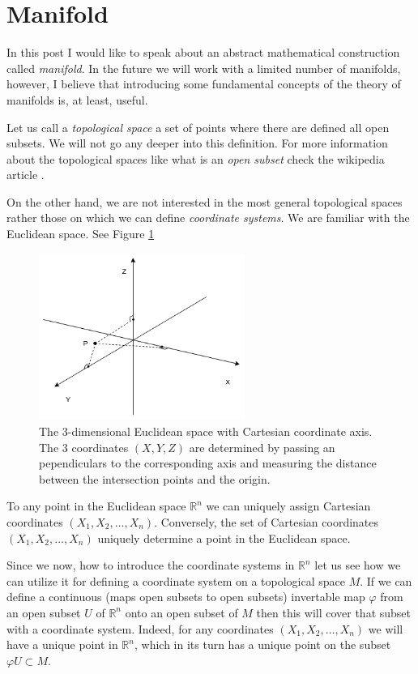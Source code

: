 \documentclass[a4paper,10pt]{article}
\title{}
\author{}
\begin{document}
\section{Manifold}

In this post I would like to speak about an abstract mathematical construction called {\it manifold}. In the future we will work with a limited number of manifolds, however, I believe that introducing some fundamental concepts of the theory of manifolds is, at least, useful. 

Let us call a {\it topological space } a set of points where there are defined all open subsets. We will not go any deeper into this definition. For more information about the topological spaces like what is an {\it open subset} check the wikipedia article \cite{topspace}. 

On the other hand, we are not interested in the most general topological spaces rather those on which we can define {\it coordinate systems}. We are familiar with the Euclidean space. See Figure \ref{fig:3dcart}

\begin{figure}[h]
\centering
 \includegraphics[width=0.6\textwidth]{../../images/3DEuclidean.png}
 \caption{The 3-dimensional Euclidean space with Cartesian coordinate axis. The 3 coordinates $(X,Y,Z)$ are determined by passing an pependiculars to the corresponding axis and measuring the distance between the intersection points and the origin. }
 \label{fig:3dcart}
\end{figure}
 
To any point in the Euclidean space $\mathbb{R}^n$  we can uniquely assign Cartesian coordinates $(X_1, X_2,\ldots, X_n)$. Conversely, the set of  Cartesian coordinates $(X_1, X_2,\ldots, X_n)$ uniquely determine a point in the Euclidean space. 

Since we now, how to introduce the coordinate systems in $\mathbb{R}^n$ let us see how we can utilize it for defining a coordinate system on a  topological space $M$. If we can define a continuous (maps open subsets to open subsets) invertable map $\varphi$ from an open subset $U$ of $\mathbb{R}^n$ onto an open subset of $M$ then this will cover that subset with a coordinate system. Indeed, for any coordinates $(X_1, X_2,\ldots, X_n)$ we will have a unique point in $\mathbb{R}^n$, which in its turn has a unique point on the subset $\varphi U \subset M$. 
\end{document}
